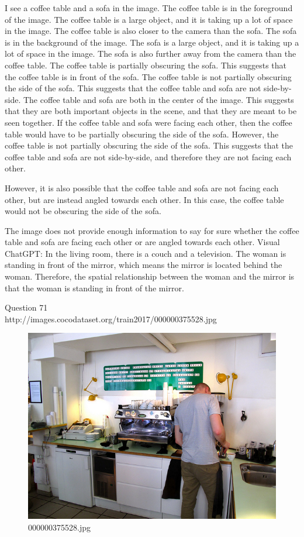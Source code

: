 \begin{enumerate}
    I see a coffee table and a sofa in the image.
    The coffee table is in the foreground of the image. The coffee table is a large object, and it is taking up a lot of space in the image. The coffee table is also closer to the camera than the sofa.
    The sofa is in the background of the image. The sofa is a large object, and it is taking up a lot of space in the image. The sofa is also further away from the camera than the coffee table.
    The coffee table is partially obscuring the sofa. This suggests that the coffee table is in front of the sofa.
    The coffee table is not partially obscuring the side of the sofa. This suggests that the coffee table and sofa are not side-by-side.
    The coffee table and sofa are both in the center of the image. This suggests that they are both important objects in the scene, and that they are meant to be seen together.
    If the coffee table and sofa were facing each other, then the coffee table would have to be partially obscuring the side of the sofa. However, the coffee table is not partially obscuring the side of the sofa. This suggests that the coffee table and sofa are not side-by-side, and therefore they are not facing each other.
    
    However, it is also possible that the coffee table and sofa are not facing each other, but are instead angled towards each other. In this case, the coffee table would not be obscuring the side of the sofa.
    
    The image does not provide enough information to say for sure whether the coffee table and sofa are facing each other or are angled towards each other.
    \subitem Visual ChatGPT: In the living room, there is a couch and a television. The woman is standing in front of the mirror, which means the mirror is located behind the woman. Therefore, the spatial relationship between the woman and the mirror is that the woman is standing in front of the mirror.
\end{enumerate}
Question 71\\
http://images.cocodataset.org/train2017/000000375528.jpg
\begin{figure}[h]
    \centering
    \includegraphics[width=0.8\linewidth]{../image set/hard/000000375528.jpg}
    \caption{000000375528.jpg}
\end{figure}
